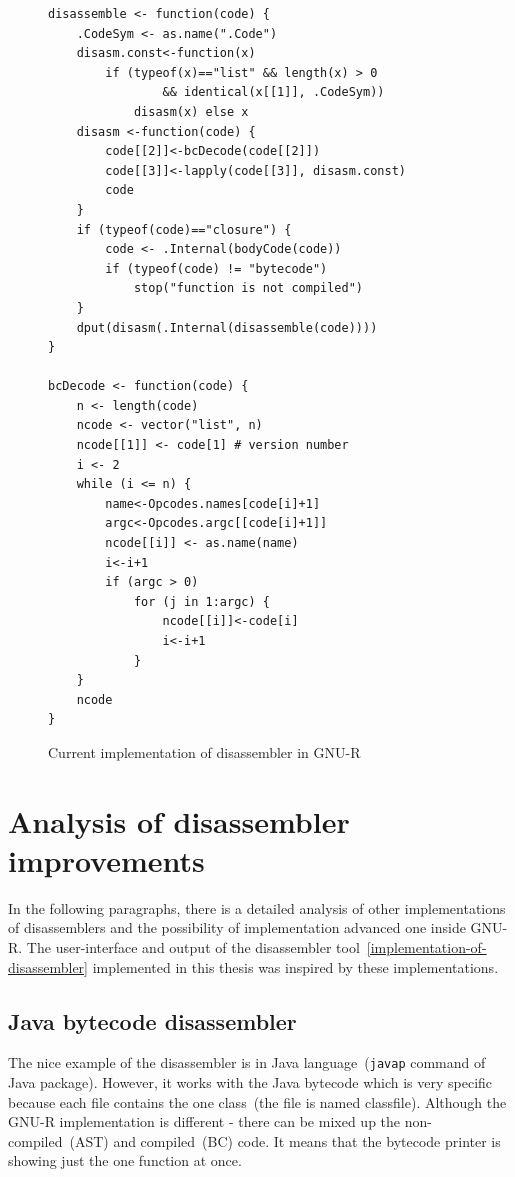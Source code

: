 \documentclass[thesis=M,english]{FITthesis}[2018/10/20]
\newcommand{\code}[1]{\texttt{#1}}
\begin{document}
\begin{figure}[!htb]
\begin{lstlisting}
disassemble <- function(code) {
    .CodeSym <- as.name(".Code")
    disasm.const<-function(x)
        if (typeof(x)=="list" && length(x) > 0
        		&& identical(x[[1]], .CodeSym))
            disasm(x) else x
    disasm <-function(code) {
        code[[2]]<-bcDecode(code[[2]])
        code[[3]]<-lapply(code[[3]], disasm.const)
        code
    }
    if (typeof(code)=="closure") {
        code <- .Internal(bodyCode(code))
        if (typeof(code) != "bytecode")
            stop("function is not compiled")
    }
    dput(disasm(.Internal(disassemble(code))))
}

bcDecode <- function(code) {
    n <- length(code)
    ncode <- vector("list", n)
    ncode[[1]] <- code[1] # version number
    i <- 2
    while (i <= n) {
        name<-Opcodes.names[code[i]+1]
        argc<-Opcodes.argc[[code[i]+1]]
        ncode[[i]] <- as.name(name)
        i<-i+1
        if (argc > 0)
            for (j in 1:argc) {
                ncode[[i]]<-code[i]
                i<-i+1
            }
    }
    ncode
}
\end{lstlisting}
	\caption{Current implementation of disassembler in GNU-R}\label{fig:current-implementation-of-disassembler}
\end{figure}


\section{Analysis of disassembler improvements}\label{analysis-of-disassembler}

In the following paragraphs, there is a detailed analysis of other implementations of disassemblers and the possibility of implementation advanced one inside GNU-R. The user-interface and output of the disassembler tool~\ref{implementation-of-disassembler} implemented in this thesis was inspired by these implementations.

\subsection{Java bytecode disassembler}

The nice example of the disassembler is in Java language~(\code{javap} command of Java package). However, it works with the Java bytecode which is very specific because each file contains the one class~(the file is named classfile). Although the GNU-R implementation is different - there can be mixed up the non-compiled~(AST) and compiled~(BC) code. It means that the bytecode printer is showing just the one function at once.
\end{document}
